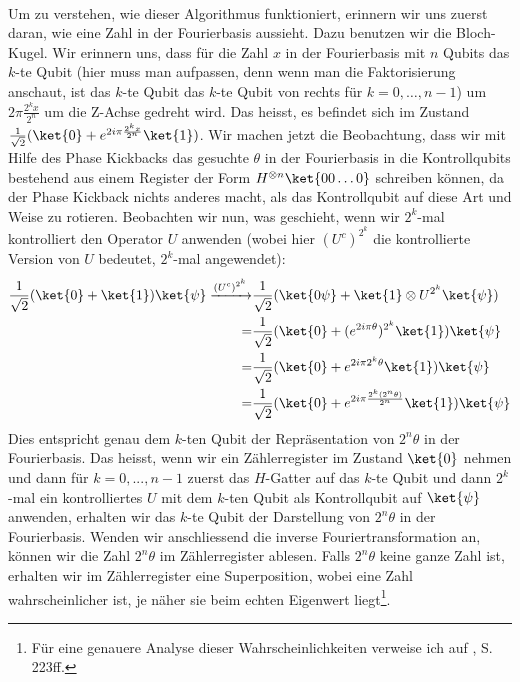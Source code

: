\paragraph{}
\noindent Um zu verstehen, wie dieser Algorithmus funktioniert, erinnern wir uns zuerst daran, wie eine Zahl in der Fourierbasis aussieht. Dazu benutzen wir die Bloch-Kugel. Wir erinnern uns, dass für die Zahl $x$ in der Fourierbasis mit $n$ Qubits das $k$-te Qubit (hier muss man aufpassen, denn wenn man die Faktorisierung anschaut, ist das $k$-te Qubit das $k$-te Qubit von rechts für $k = 0, \dots, n - 1$) um $2\pi\frac{2^kx}{2^n}$ um die Z-Achse gedreht wird. Das heisst, es befindet sich im Zustand $\frac{1}{\sqrt{2}}(\ket{0} + e^{2i\pi\frac{2^kx}{2^n}}\ket{1})$. Wir machen jetzt die Beobachtung, dass wir mit Hilfe des Phase Kickbacks das gesuchte $\theta$ in der Fourierbasis in die Kontrollqubits bestehend aus einem Register der Form $H^{\otimes n}\ket{00\dots 0}$ schreiben können, da der Phase Kickback nichts anderes macht, als das Kontrollqubit auf diese Art und Weise zu rotieren. Beobachten wir nun, was geschieht, wenn wir $2^k$-mal kontrolliert den Operator $U$ anwenden (wobei hier $(U^c)^{2^k}$ die kontrollierte Version von $U$ bedeutet, $2^k$-mal angewendet):
\begin{align*}
\frac{1}{\sqrt{2}}(\ket{0} + \ket{1})\ket{\psi} \xrightarrow{(U^c)^{2^k}} &\frac{1}{\sqrt{2}}(\ket{0\psi} + \ket{1}\otimes U^{2^k}\ket{\psi}) \\ = &\frac{1}{\sqrt{2}}(\ket{0} + (e^{2i\pi\theta})^{2^k}\ket{1})\ket{\psi} \\
= &\frac{1}{\sqrt{2}}(\ket{0} + e^{2i\pi2^k\theta}\ket{1})\ket{\psi} \\
= &\frac{1}{\sqrt{2}}(\ket{0} + e^{2i\pi\frac{2^k(2^n\theta)}{2^n}}\ket{1})\ket{\psi}
\end{align*}
Dies entspricht genau dem $k$-ten Qubit der Repräsentation von $2^n\theta$ in der Fourierbasis. Das heisst, wenn wir ein Zählerregister im Zustand $\ket{0}$ nehmen und dann für $k = 0, ..., n - 1$ zuerst das $H$-Gatter auf das $k$-te Qubit und dann $2^k$-mal ein kontrolliertes $U$ mit dem $k$-ten Qubit als Kontrollqubit auf $\ket{\psi}$ anwenden, erhalten wir das $k$-te Qubit der Darstellung von $2^n\theta$ in der Fourierbasis. Wenden wir anschliessend die inverse Fouriertransformation an, können wir die Zahl $2^n\theta$ im Zählerregister ablesen. Falls $2^n\theta$ keine ganze Zahl ist, erhalten wir im Zählerregister eine Superposition, wobei eine Zahl wahrscheinlicher ist, je näher sie beim echten Eigenwert liegt\footnote{Für eine genauere Analyse dieser Wahrscheinlichkeiten verweise ich auf \cite{QC}, S. 223ff.}.

